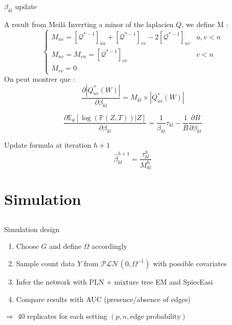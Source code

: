 \documentclass[9pt]{beamer}
\newcommand{\emphase}[1]{\textcolor{Complement}{#1}}
\begin{document}
 \begin{frame}{$\beta_{kl}$ update}
 \begin{exampleblock}{A result from Meil{\u{a}} \cite{MixtTrees}}
Inverting a minor of the laplacien $Q$, we define M : 
\[\begin{cases}
    M_{uv} = [\mathcal{Q}^{*-1}]_{uu} + [\mathcal{Q}^{*-1}]_{vv} -2[\mathcal{Q}^{*-1}]_{uv} & u,v < n\\
    M_{nv} =M_{vn} =[\mathcal{Q}^{*-1}]_{vv} & v<n\\
     M_{vv} =0.
   \end{cases}\]
On peut montrer que :
\[ \frac{\partial|Q^*_{uv}(W)|}{\partial \beta_{kl}} = M_{kl} \times |Q^*_{uv}(W)|\]
\end{exampleblock}
\[ \frac{\partial\mathds{E}_\theta[\log(\mathds{P}(Z,T))|Z]}{\partial\beta_{kl}} =\frac{1 }{\beta_{kl}} \tau_{kl} - \frac{1}{B}
\frac{\partial B}{\partial\beta_{kl}}
\]


\begin{block}{Update formula at iteration $h+1$}
   \large{\[\hat{\beta}_{kl}^{h+1} = \frac{\tau_{kl}^h}{M_{kl}^h}\]}
   \end{block}
 \end{frame}
\section{Simulation}


\subsection{}

\begin{frame}{Simulation design}

\begin{enumerate}
     \item Choose  \emphase{$G$} and define  \emphase{$\Omega$} accordingly\vspace{0.3cm} 
     \item Sample count data \emphase{$Y$} from $\mathcal{PLN}(0,\Omega^{-1})$ with possible covariates
     \item Infer the network with \emphase{PLN + mixture tree EM}  and \emphase{SpiecEasi} \vspace{0.3cm}
     \item Compare results with \emphase{AUC} (presence/absence of edges)
\end{enumerate}\bigskip\bigskip
\hspace{1cm}$\Rightarrow$ 40 replicates for each setting $(p, n, \text{edge probability})$
	
\end{frame}
\end{document}
